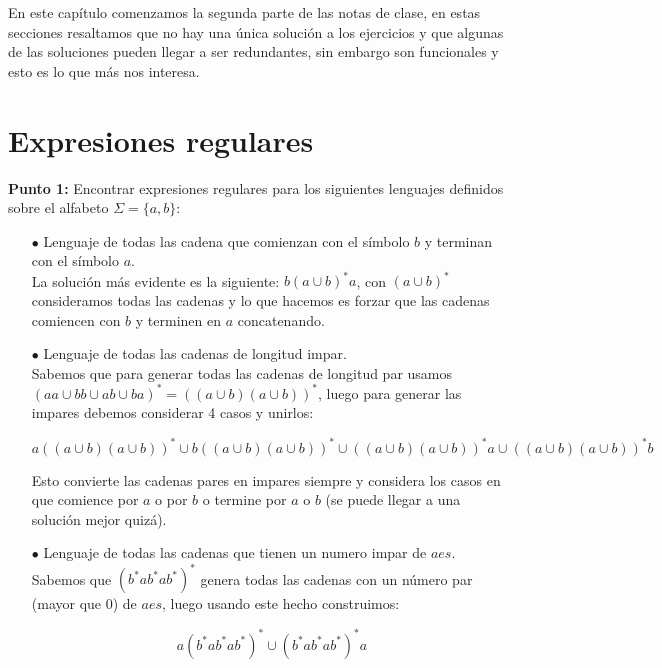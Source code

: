En este capítulo comenzamos la segunda parte de las notas de clase, en estas secciones resaltamos que no hay una única solución a los ejercicios y que algunas de las soluciones pueden llegar a ser redundantes, sin embargo son funcionales y esto es lo que más nos interesa.

\section{Expresiones regulares}

\textbf{Punto 1: }Encontrar expresiones regulares para los siguientes lenguajes definidos sobre el alfabeto $\Sigma=\{a,b\}:$

\begin{itemize}

    \item [$\bullet$] Lenguaje de todas las cadena que comienzan con el símbolo $b$ y terminan con el símbolo $a$.\\ 

    La solución más evidente es la siguiente: $b(a\cup b)^*a$, con $(a\cup b)^*$ consideramos todas las cadenas y lo que hacemos es forzar que las cadenas comiencen con $b$ y terminen en $a$ concatenando.

    \item[$\bullet$]Lenguaje de todas las cadenas de longitud impar.\\

     Sabemos que para generar todas las cadenas de longitud par usamos $(aa\cup bb\cup ab\cup ba)^*=((a\cup b)(a\cup b))^*$, luego para generar las impares debemos considerar 4 casos y unirlos:

    $$a((a\cup b)(a\cup b))^*\cup b((a\cup b)(a\cup b))^* \cup ((a\cup b)(a\cup b))^*a \cup ((a\cup b)(a\cup b))^*b$$

    Esto convierte las cadenas pares en impares siempre y considera los casos en que comience por $a$ o por $b$ o termine por $a$ o $b$ (se puede llegar a una solución mejor quizá).

    \item[$\bullet$] Lenguaje de todas las cadenas que tienen un numero impar de $aes.$\\ 

    Sabemos que $(b^*ab^*ab^*)^*$ genera todas las cadenas con un número par (mayor que 0) de $aes$, luego usando este hecho construimos:

    $$a(b^*ab^*ab^*)^*\cup (b^*ab^*ab^*)^*a$$


\end{itemize}
